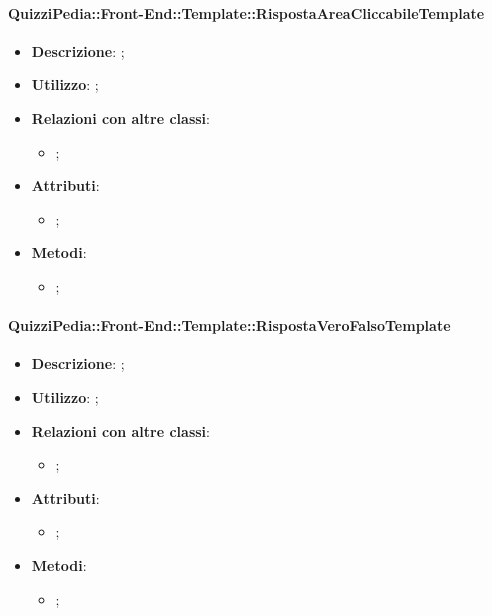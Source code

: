 		\paragraph{QuizziPedia::Front-End::Template::RispostaAreaCliccabileTemplate}
			\begin{itemize}
				\item \textbf{Descrizione}: ;
				\item \textbf{Utilizzo}: ;
				\item \textbf{Relazioni con altre classi}: 
				\begin{itemize}
					\item ;
				\end{itemize}
				\item \textbf{Attributi}: 
				\begin{itemize}
					\item ;
				\end{itemize}
				\item \textbf{Metodi}: 
				\begin{itemize}
					\item ;
				\end{itemize}
			\end{itemize}
		
		\paragraph{QuizziPedia::Front-End::Template::RispostaVeroFalsoTemplate}
			\begin{itemize}
				\item \textbf{Descrizione}: ;
				\item \textbf{Utilizzo}: ;
				\item \textbf{Relazioni con altre classi}: 
				\begin{itemize}
					\item ;
				\end{itemize}
				\item \textbf{Attributi}: 
				\begin{itemize}
					\item ;
				\end{itemize}
				\item \textbf{Metodi}: 
				\begin{itemize}
					\item ;
				\end{itemize}
			\end{itemize}
		
